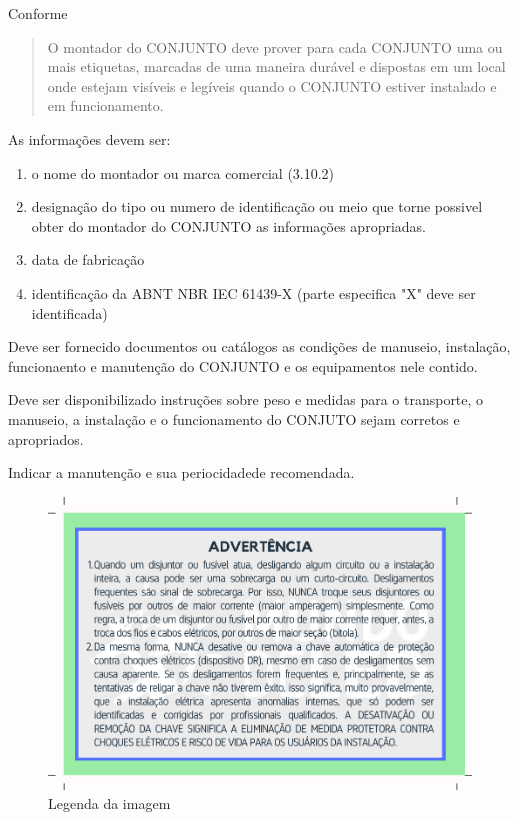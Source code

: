 Conforme \cite{NBRIEC61439-12017} 
\begin{quote}
O montador do CONJUNTO deve prover para cada CONJUNTO uma ou mais etiquetas, marcadas de uma maneira durável e dispostas em um local onde estejam visíveis e legíveis quando o CONJUNTO estiver instalado e em funcionamento.
\end{quote}
As informações devem ser:
\begin{enumerate}
\item o nome do montador ou marca comercial (3.10.2)
\item designação do tipo ou numero de identificação ou meio que torne possivel obter do montador do CONJUNTO  as informações apropriadas.
\item data de fabricação
\item identificação da ABNT NBR IEC 61439-X (parte especifica "X" deve ser identificada)
\end{enumerate}

Deve ser fornecido documentos ou catálogos as condições de manuseio, instalação, funcionaento e manutenção do CONJUNTO e os equipamentos nele contido.

Deve ser disponibilizado instruções sobre peso e medidas para o transporte, o manuseio, a instalação e o funcionamento do CONJUTO sejam corretos e apropriados. 

Indicar a manutenção e sua periocidadede recomendada.


\begin{figure}[ht]
    \centering
    \includegraphics{image/EtiqAdvQD.pdf}
    \caption{Legenda da imagem}
    \label{fig:etiqueta}
\end{figure}

